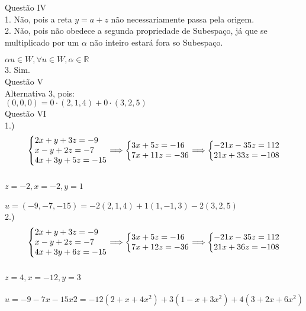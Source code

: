 \documentclass[12pt]{article}
\begin{document}
Questão IV\\
1. Não, pois a reta $y = a + z$ não necessariamente passa pela origem.\\
2. Não, pois não obedece a segunda propriedade de Subespaço, já que se multiplicado por um $\alpha$ não inteiro estará fora so Subespaço.
\par $\alpha u \in W, \forall u \in W, \alpha \in \mathds{R}$\\
3. Sim.\\

Questão V\\
Alternativa 3, pois:\\
$(0, 0, 0) = 0\cdot(2, 1, 4) + 0\cdot(3, 2, 5)$\\

Questão VI\\
1.)\\
\begin{equation}
\left\{\begin{array}{@{}l@{}}
	2x+y+3z=-9\\
	x-y+2z=-7\\
	4x+3y+5z=-15
\end{array}\right. \Longrightarrow
\left\{\begin{array}{@{}l@{}}
	3x+5z=-16\\
	7x+11z=-36
\end{array}\right. \Longrightarrow
\left\{\begin{array}{@{}l@{}}
	-21x-35z=112\\
	21x+33z=-108
\end{array}\right.
\end{equation}\\
$z = -2, x = -2, y = 1$\\\\
$u = (-9, -7, -15) = -2(2, 1, 4) + 1(1, -1, 3) -2(3, 2, 5)$\\
2.)\\
\begin{equation}
\left\{\begin{array}{@{}l@{}}
	2x+y+3z=-9\\
	x-y+2z=-7\\
	4x+3y+6z=-15
\end{array}\right. \Longrightarrow
\left\{\begin{array}{@{}l@{}}
	3x+5z=-16\\
	7x+12z=-36
\end{array}\right. \Longrightarrow
\left\{\begin{array}{@{}l@{}}
	-21x-35z=112\\
	21x+36z=-108
\end{array}\right.
\end{equation}\\
$z = 4, x = -12, y = 3$\\\\
$u = -9 -7x -15x{2} = -12(2 + x + 4x^{2}) + 3(1 - x + 3x^{2}) + 4(3 + 2x + 6x^{2})$\\
\end{document}
